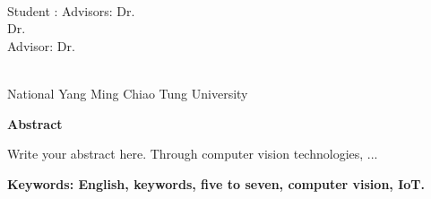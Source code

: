 \begin{center}
    \large
    
    \begin{singlespace}
        \textbf{\englishTitle{}} \\[0.5cm]
    \end{singlespace}
    
    \begin{singlespace}
        Student : \studentEnName{}  \hspace{1.0cm} 
        \ifdefined\advisorCnNameB
            Advisors: Dr.\, \advisorEnName \\
            \hspace{6.6cm} Dr.\, \advisorEnNameB  \\
        \else
            Advisor: Dr.\, \advisorEnName \\
        \fi
    \end{singlespace}
    
    \vspace{0.5cm}
    \begin{singlespace}
        \NameofDepartmentInstituteEN\\
        National Yang Ming Chiao Tung University\\[0.2cm]
    \end{singlespace}
    
    \textbf{Abstract} \\[0.5cm]

\end{center}

\normalsize 
  
Write your abstract here. Through computer vision technologies, ...


\vspace{1cm}

\textbf{Keywords: English, keywords, five to seven, computer vision, IoT.} 
